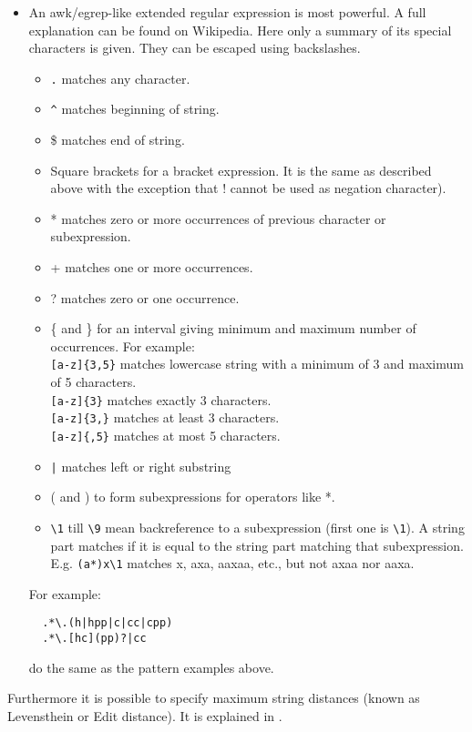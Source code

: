 \begin{itemize}
\item An awk/egrep-like extended regular expression is most powerful. A
  full explanation can be found on Wikipedia. Here only a
  summary of its special characters is given. They can be escaped
  using backslashes.
  \begin{itemize}
  \item \texttt{.} matches any character.
  \item \verb+^+ matches beginning of string.
  \item \$ matches end of string.
  \item Square brackets for a bracket expression. It is the same as
    described above with the exception that ! cannot be used as negation character).
  \item * matches zero or more occurrences of previous character or subexpression.
  \item + matches one or more occurrences.
  \item ? matches zero or one occurrence.
  \item \{ and \} for an interval giving minimum and maximum number of
    occurrences. For example:
    \\\texttt{[a-z]\{3,5\}} matches lowercase string with a minimum of 3
    and maximum of 5 characters.
    \\\texttt{[a-z]\{3\}} matches exactly 3 characters.
    \\\texttt{[a-z]\{3,\}} matches at least 3 characters.
    \\\texttt{[a-z]\{,5\}} matches at most 5 characters.
  \item \verb+|+ matches left or right substring
  \item ( and ) to form subexpressions for operators like *.
  \item \verb+\1+ till \verb+\9+ mean backreference to a subexpression (first one is
    \verb+\1+). A string part matches if it is equal to the string
    part matching that subexpression.
    E.g. \verb+(a*)x\1+ matches x, axa, aaxaa, etc.,
    but not axaa nor aaxa.
  \end{itemize}
  For example:
\begin{verbatim}
  .*\.(h|hpp|c|cc|cpp)
  .*\.[hc](pp)?|cc
\end{verbatim}
  do the same as the pattern examples above.
\end{itemize}
Furthermore it is possible to specify maximum string distances
(known as Levensthein or Edit distance). It is explained in 
.

